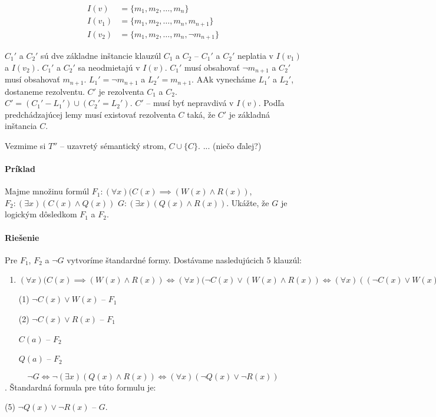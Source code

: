 \begin{align*}
    I(v)    &= \{ m_1, m_2, \ldots, m_n \} \\
    I(v_1)  &= \{ m_1, m_2, \ldots, m_n, m_{n+1} \}  \\
    I(v_2)  &= \{ m_1, m_2, \ldots, m_n, \neg m_{n+1} \} 
\end{align*}

$C_1'$ a $C_2'$ sú dve základne inštancie klauzúl $C_1$ a $C_2$ -- $C_1'$ a
$C_2'$ neplatia v $I(v_1)$ a $I(v_2)$. $C_1'$ a $C_2'$ sa neodmietajú v $I(v)$.
$C_1'$ musí obsahovať $\neg m_{n+1}$ a $C_2'$ musí obsahovať $m_{n+1}$. $L_1' =
\neg m_{n+1}$ a $L_2' = m_{n+1}$. AAk vynecháme $L_1'$ a $L_2'$, dostaneme
rezolventu. $C'$ je rezolventa $C_1$ a $C_2$. $C' = (C_1' - L_1') \cup (C_2' =
L_2')$. $C'$ -- musí byť nepravdivá v $I(v)$. Podľa predchádzajúcej lemy musí
existovať rezolventa $C$ taká, že $C'$ je základná inštancia $C$.

\par Vezmime si $T''$ -- uzavretý sémantický strom, $C \cup \{C\}$. ... (niečo
ďalej?)



\paragraph{Príklad} Majme množinu formúl $F_1: (\forall x) (C(x) \implies (W(x)
\land R(x))$, $F_2: (\exists x)(C(x) \land Q(x))$ $G: (\exists x) (Q(x) \land
R(x))$. Ukážte, že $G$ je logickým dôsledkom $F_1$ a $F_2$.

\paragraph{Riešenie} Pre $F_1$, $F_2$ a $\neg G$ vytvoríme štandardné formy.
Dostávame nasledujúcich 5 klauzúl:
\begin{enumerate}
	\item $(\forall x) (C(x) \implies (W(x) \land R(x)) \iff (\forall
	x)(\neg C(x) \lor (W(x)\land R(x)) \iff (\forall x) ((\neg C(x) \lor
	W(x)) \land (\neg C(x) \lor R(x)))$
	\par (1) $\neg C(x) \lor W(x)$ -- $F_1$
	\par (2) $\neg C(x) \lor R(x)$ -- $F_1$
	\par $C(a)$ -- $F_2$
	\par $Q(a)$ -- $F_2$
\end{enumerate}
$$\neg G \iff \neg (\exists x)(Q(x)\land R(x)) \iff (\forall x) (\neg Q(x) \lor
\neg R(x)) $$. Štandardná formula pre túto formulu je:
\par (5) $\neg Q(x) \lor \neg R(x)$ -- $G$.

